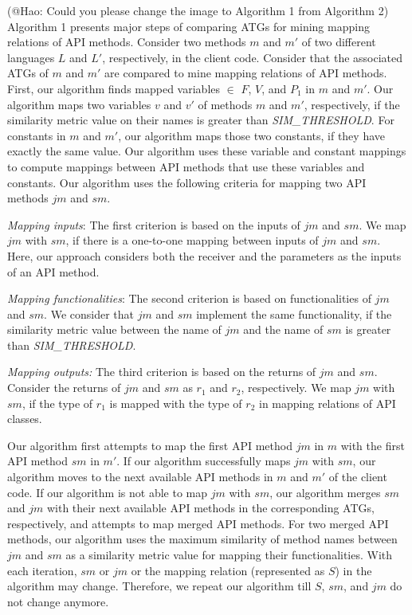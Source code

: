 (@Hao: Could you please change the image to Algorithm 1 from Algorithm 2)
Algorithm 1 presents major steps of comparing ATGs for mining
mapping relations of API methods. Consider two methods $m$ and $m'$
of two different languages $L$ and $L'$, respectively, in the client
code. Consider that the associated ATGs of $m$ and $m'$ are compared
to mine mapping relations of API methods. First, our algorithm finds
mapped variables $\in$ $F$, $V$, and $P_1$ in $m$ and $m'$. Our
algorithm maps two variables $v$ and $v'$ of methods $m$ and $m'$,
respectively, if the similarity metric value on their names is greater
than \emph{SIM\_THRESHOLD}. For constants in $m$ and $m'$, our
algorithm maps those two constants, if they have exactly the same
value. Our algorithm uses these variable and constant mappings to
compute mappings between API methods that use these variables and
constants. Our algorithm uses the following criteria for mapping two
API methods $jm$ and $sm$.

\emph{Mapping inputs}: The first criterion is based on the inputs
of $jm$ and $sm$. We map $jm$ with $sm$, if there is a one-to-one
mapping between inputs of $jm$ and $sm$. Here, our approach
considers both the receiver and the parameters as the inputs of an
API method.

\emph{Mapping functionalities}: The second criterion is based on functionalities of
$jm$ and $sm$. We consider that $jm$ and $sm$ implement the same functionality,
if the similarity metric value between the name of $jm$ and the name of $sm$ is
greater than \emph{SIM\_THRESHOLD}.

\emph{Mapping outputs:} The third criterion is based on the returns of $jm$ and $sm$.
Consider the returns of $jm$ and $sm$ as $r_1$ and $r_2$, respectively. We map $jm$
with $sm$, if the type of $r_1$ is mapped with the type of $r_2$ in
mapping relations of API classes.

Our algorithm first attempts to map the first API method $jm$ in $m$
with the first API method $sm$ in $m'$. If our algorithm successfully maps $jm$ with
$sm$, our algorithm moves to the next available API methods in $m$
and $m'$ of the client code. If our algorithm is not able to map $jm$
with $sm$, our algorithm merges $sm$ and $jm$ with their next available API methods
in the corresponding ATGs, respectively, and attempts to map merged API methods.
For two merged API methods, our algorithm uses the
maximum similarity of method names between $jm$ and $sm$ as a
similarity metric value for mapping their functionalities.
With each iteration, $sm$ or $jm$ or the mapping relation (represented as $S$)
in the algorithm may change. Therefore, we repeat our algorithm
till $S$, $sm$, and $jm$ do not change anymore.

